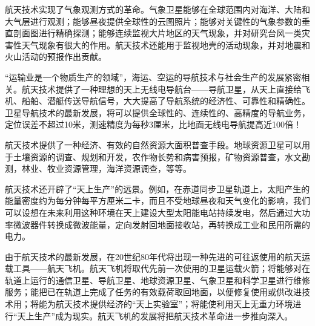 航天技术实现了气象观测方式的革命。气象卫星能够在全球范围内对海洋、大陆和大气层进行观测；能够昼夜提供全球性的云图照片；能够对关键性的气象参数的垂直剖面图进行精确探测；能够连续监视大片地区的天气现象，并对研究台风一类灾害性天气现象有很大的作用。航天技术还能用于监视地壳的活动现象，并对地震和火山活动的预报作出贡献。

“运输业是一个物质生产的领域”，海运、空运的导航技术与社会生产的发展紧密相关。航天技术提供了一种理想的天上无线电导航台——导航卫星，从天上直接给飞机、船舶、潜艇传送导航信号，大大提高了导航系统的经济性、可靠性和精确性。卫星导航技术的最新发展，将可以提供全球性的、连续性的、高精度的导航业务，定位误差不超过10米，测速精度为每秒3厘米，比地面无线电导航提高近100倍！

航天技术提供了一种经济、有效的自然资源大面积普查手段。地球资源卫星可以用于土壤资源的调查、规划和开发，农作物长势和病害预报，矿物资源普查，水文勘测，林业、牧业资源管理，海洋资源调查，等等。

航天技术还开辟了“天上生产”的远景。例如，在赤道同步卫星轨道上，太阳产生的能量密度约为每分钟每平方厘米二卡，而且不受地球昼夜和天气变化的影响，我们可以设想在未来利用这种环境在天上建设大型太阳能电站持续发电，然后通过大功率微波器件转换成微波能量，定向发射回地面接收站，再转换成工业和民用所需的电力。

由于航天技术的最新发展，在20世纪80年代将出现一种先进的可往返使用的航天运载工具——航天飞机。航天飞机将取代先前一次使用的卫星运载火箭；将能够对在轨道上运行的通信卫星、导航卫星、地球资源卫星、气象卫星和科学卫星进行维修服务；能把已在轨道上完成了任务的有效载荷取回地面，以便修复使用或供改进技术用；将能为航天技术提供经济的“天上实验室”；将能使利用天上无重力环境进行“天上生产”成为现实。航天飞机的发展将把航天技术革命进一步推向深入。

